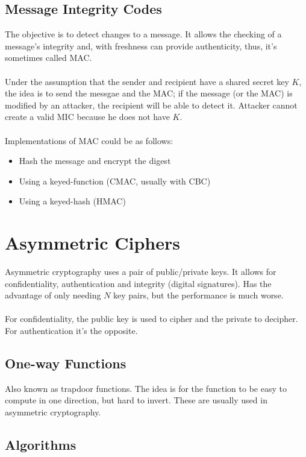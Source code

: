 \documentclass[10pt,a4paper]{report}
\begin{document}
\subsection{Message Integrity Codes}
The objective is to detect changes to a message. It allows the checking of a message's integrity and, with freshness can provide authenticity, thus, it's sometimes called MAC.\\
\\
Under the assumption that the sender and recipient have a shared secret key $K$, the idea is to send the messgae and the MAC; if the message (or the MAC) is modified by an attacker, the recipient will be able to detect it. Attacker cannot create a valid MIC because he does not have $K$.\\
\\
Implementations of MAC could be as follows:
\begin{itemize}
\item Hash the message and encrypt the digest
\item Using a keyed-function (CMAC, usually with CBC)
\item Using a keyed-hash (HMAC)
\end{itemize}
\section{Asymmetric Ciphers}
Asymmetric cryptography uses a pair of public/private keys. It allows for confidentiality, authentication and integrity (digital signatures). Has the advantage of only needing $N$ key pairs, but the performance is much worse.\\
\\
For confidentiality, the public key is used to cipher and the private to decipher. For authentication it's the opposite.
\subsection{One-way Functions}
Also known as trapdoor functions. The idea is for the function to be easy to compute in one direction, but hard to invert. These are usually used in asymmetric cryptography.
\subsection{Algorithms}
\end{document}
